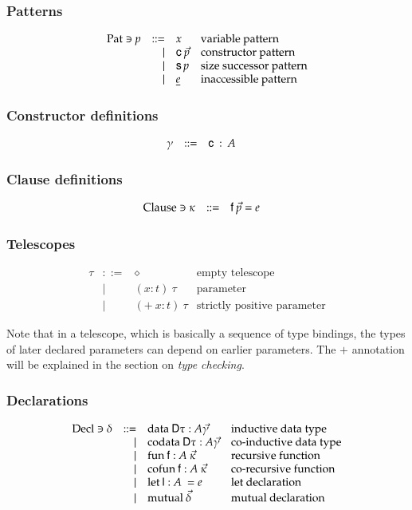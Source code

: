 \subsubsection{Patterns}
\[
\begin{array}{lrll}
\mathrm{Pat} \ni p & ::= & x & \mbox{variable pattern}\\
& \mid & \mathsf{c} \: \vec{p} & \mbox{constructor pattern}\\
& \mid & \mathsf{s}\, p & \mbox{size successor pattern}\\
& \mid & \underline{e} & \mbox{inaccessible pattern}\\
\end{array}
\]

\subsubsection{Constructor definitions}
\[
\begin{array}{lrll}
\gamma &  ::= & \mathsf{c} \: : \: A & 
\end{array}
\]

\subsubsection{Clause definitions}
\[
\begin{array}{lrll}
\mathrm{Clause} \ni \kappa & ::= & \mathsf{f} \: \vec{p} = e & 
\end{array}
\]

\subsubsection{Telescopes}
\[
\begin{array}{lrll}
\tau & ::= & \diamond & \mbox{empty telescope}\\
& \mid & ( x : t ) \: \tau & \mbox{parameter}\\
& \mid & ( + \: x : t ) \: \tau & \mbox{strictly positive parameter}
\end{array}
\]

Note that in a telescope, which is basically a sequence of type bindings, the types of later declared parameters can depend on earlier parameters. The $+$ annotation will be explained in the section on \emph{type checking}. 

\subsubsection{Declarations}
\[
\begin{array}{lrll}
\mathrm{Decl} \ni \delta & ::= & \mathrm{data}\: \mathsf{D} \tau : A \vec{\gamma} & \mbox{inductive data type}\\ 
& \mid & \mathrm{codata}\: \mathsf{D} \tau : A \vec{\gamma} & \mbox{co-inductive data type} \\
& \mid & \mathrm{fun}\: \mathsf{f} : A \: \vec{\kappa} & \mbox{recursive function}\\
& \mid & \mathrm{cofun}\: \mathsf{f} : A \: \vec{\kappa} & \mbox{co-recursive function}\\ 
& \mid & \mathrm{let}\: \mathsf{l} : A \: = e & \mbox{let declaration}\\
& \mid & \mathrm{mutual}\: \vec{\delta} & \mbox{mutual declaration}
\end{array}
\]



